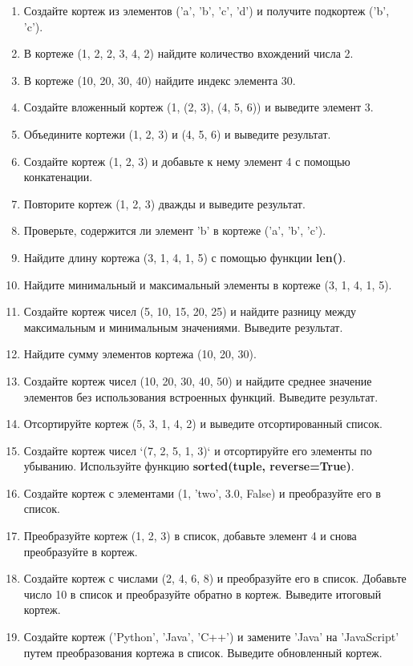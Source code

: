 \documentclass[a4,12pt]{article}
\theoremstyle{remark}
\begin{document}
\begin{enumerate}
    \item Создайте кортеж из элементов ('a', 'b', 'c', 'd') и получите подкортеж ('b', 'c').
    \item В кортеже (1, 2, 2, 3, 4, 2) найдите количество вхождений числа 2.
    \item В кортеже (10, 20, 30, 40) найдите индекс элемента 30.
    \item Создайте вложенный кортеж (1, (2, 3), (4, 5, 6)) и выведите элемент 3.
    \item Объедините кортежи (1, 2, 3) и (4, 5, 6) и выведите результат.
    \item Создайте кортеж (1, 2, 3) и добавьте к нему элемент 4 с помощью конкатенации.
    \item Повторите кортеж (1, 2, 3) дважды и выведите результат.
    \item Проверьте, содержится ли элемент 'b' в кортеже ('a', 'b', 'c').
    \item Найдите длину кортежа (3, 1, 4, 1, 5) с помощью функции \textbf{len()}.
    \item Найдите минимальный и максимальный элементы в кортеже (3, 1, 4, 1, 5).
    \item Создайте кортеж чисел (5, 10, 15, 20, 25) и найдите разницу между максимальным и минимальным значениями. Выведите результат.
    \item Найдите сумму элементов кортежа (10, 20, 30).
    \item Создайте кортеж чисел (10, 20, 30, 40, 50) и найдите среднее значение элементов без использования встроенных функций. Выведите результат.
    \item Отсортируйте кортеж (5, 3, 1, 4, 2) и выведите отсортированный список.
    \item Создайте кортеж чисел `(7, 2, 5, 1, 3)` и отсортируйте его элементы по убыванию. Используйте функцию \textbf{sorted(tuple, reverse=True)}.
    \item Создайте кортеж с элементами (1, 'two', 3.0, False) и преобразуйте его в список.
    \item Преобразуйте кортеж (1, 2, 3) в список, добавьте элемент 4 и снова преобразуйте в кортеж.
    \item Создайте кортеж с числами (2, 4, 6, 8) и преобразуйте его в список. Добавьте число 10 в список и преобразуйте обратно в кортеж. Выведите итоговый кортеж.
    \item Создайте кортеж ('Python', 'Java', 'C++') и замените 'Java' на 'JavaScript' путем преобразования кортежа в список. Выведите обновленный кортеж.

\end{enumerate}
\end{document}
